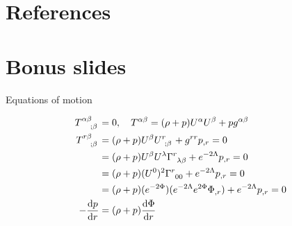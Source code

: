 \documentclass{beamer}
\let\svthefootnote\thefootnote
\newcommand\blankfootnote[1]{%
  \let\thefootnote\relax\footnotetext{#1}%
  \let\thefootnote\svthefootnote%
}
\begin{document}



\section{References}


\begin{frame}[allowframebreaks]

\nocite{*}
\printbibliography[heading=subbibliography]

\end{frame}


\section{Bonus slides}

\begin{frame}{Equations of motion}

\begin{align*}
  \tensor{T}{^{\alpha\beta}_{;\beta}} &= 0,
  \quad
  \tensor{T}{^{\alpha\beta}} = (\rho + p) U^\alpha U^\beta + p g^{\alpha\beta}
  \\
  \tensor{T}{^{r\beta}_{;\beta}} &=
  (\rho + p) U^\beta \tensor{U}{^r_{;\beta}} + g^{rr} p_{,r} = 0
  \\ &=
  (\rho + p) U^\beta U^\lambda \tensor{\Gamma}{^r_{\lambda\beta}} +
  e^{-2\Lambda} p_{,r} = 0
  \\ &=
  (\rho + p) (U^0)^2 \tensor{\Gamma}{^r_{00}} + e^{-2\Lambda} p_{,r} = 0
  \\ &=
  (\rho + p) (e^{-2\Phi}) (e^{-2\Lambda} e^{2\Phi} \Phi_{,r}) +
  e^{-2\Lambda} p_{,r} = 0
  \\
 -\dv{p}{r} &=
  (\rho + p) \dv{\Phi}{r}
\end{align*}



\blankfootnote{\textcite[pp. 101, 261]{Schutz}}

\end{frame}
\end{document}
